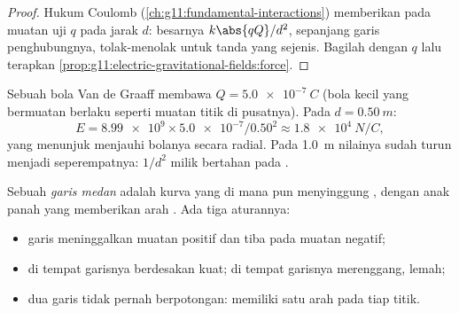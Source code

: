 \begin{proof}
Hukum Coulomb (\cref{ch:g11:fundamental-interactions}) memberikan 
pada muatan uji $q$ pada jarak $d$: besarnya $k \abs{qQ} / d^2$,
sepanjang garis penghubungnya, tolak-menolak untuk tanda yang sejenis.
Bagilah dengan $q$ lalu terapkan
\cref{prop:g11:electric-gravitational-fields:force}.
\end{proof}

\begin{example}\label{ex:g11:electric-gravitational-fields:sphere}
Sebuah bola Van de Graaff membawa $Q = \qty{+5.0e-7}{C}$ (bola kecil
yang bermuatan berlaku seperti muatan titik di pusatnya). Pada
$d = \qty{0.50}{m}$:
\[
E = \num{8.99e9} \times \num{5.0e-7} / 0.50^2 \approx \qty{1.8e4}{N/C},
\]
yang menunjuk menjauhi bolanya secara radial. Pada \qty{1.0}{m} nilainya
sudah turun menjadi seperempatnya: $1/d^2$ milik  bertahan pada
.
\end{example}

\begin{definition}\label{def:g11:electric-gravitational-fields:lines}
Sebuah \emph{garis medan} adalah kurva yang di mana
pun menyinggung , dengan anak panah yang memberikan arah
. Ada tiga aturannya:
\begin{itemize}
  \item garis  meninggalkan muatan positif dan tiba pada muatan
        negatif;
  \item di tempat garisnya berdesakan  kuat; di tempat garisnya
        merenggang,  lemah;
  \item dua garis  tidak pernah berpotongan:  memiliki
        satu arah pada tiap titik.
\end{itemize}
\end{definition}


